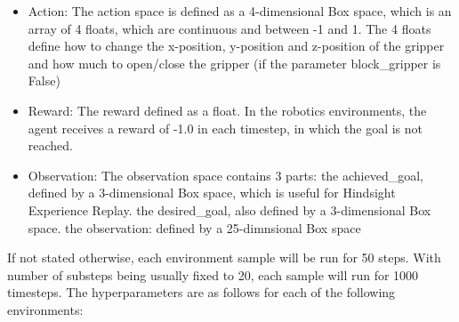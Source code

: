 \begin{itemize}
	\item Action: The action space is defined as a 4-dimensional Box space, which is an array of 4 floats, which are continuous and between -1 and 1. The 4 floats define how to change the x-position, y-position and z-position of the gripper and how much to open/close the gripper (if the parameter block\_gripper is False)
	\item Reward: The reward defined as a float. In the robotics environments, the agent receives a reward of -1.0 in each timestep, in which the goal is not reached.
	\item Observation: The observation space contains 3 parts:
	the achieved\_goal, defined by a 3-dimensional Box space, which is useful for Hindsight Experience Replay. 
	the desired\_goal, also defined by a 3-dimensional Box space.
	the observation: defined by a 25-dimnsional Box space
\end{itemize}




If not stated otherwise, each environment sample will be run for 50 steps. With number of substeps being usually fixed to 20, each sample will run for 1000 timesteps. The hyperparameters are as follows for each of the following environments:

